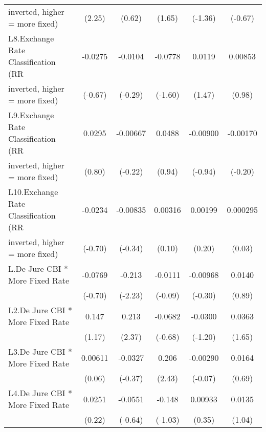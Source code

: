 \begin{table}[htbp]
\begin{tabular}{l*{5}{c}}
inverted, higher = more fixed)          &   (2.25)         &   (0.62)         &   (1.65)         &  (-1.36)         &  (-0.67)         \\
\addlinespace
L8.Exchange Rate Classification (RR     &  -0.0275         &  -0.0104         &  -0.0778         &   0.0119         &  0.00853         \\
inverted, higher = more fixed)          &  (-0.67)         &  (-0.29)         &  (-1.60)         &   (1.47)         &   (0.98)         \\
\addlinespace
L9.Exchange Rate Classification (RR     &   0.0295         & -0.00667         &   0.0488         & -0.00900         & -0.00170         \\
inverted, higher = more fixed)          &   (0.80)         &  (-0.22)         &   (0.94)         &  (-0.94)         &  (-0.20)         \\
\addlinespace
L10.Exchange Rate Classification (RR    &  -0.0234         & -0.00835         &  0.00316         &  0.00199         & 0.000295         \\
inverted, higher = more fixed)          &  (-0.70)         &  (-0.34)         &   (0.10)         &   (0.20)         &   (0.03)         \\
\addlinespace
L.De Jure CBI * More Fixed Rate         &  -0.0769         &   -0.213\sym{*}  &  -0.0111         & -0.00968         &   0.0140         \\
                                        &  (-0.70)         &  (-2.23)         &  (-0.09)         &  (-0.30)         &   (0.89)         \\
\addlinespace
L2.De Jure CBI * More Fixed Rate        &    0.147         &    0.213\sym{*}  &  -0.0682         &  -0.0300         &   0.0363         \\
                                        &   (1.17)         &   (2.37)         &  (-0.68)         &  (-1.20)         &   (1.65)         \\
\addlinespace
L3.De Jure CBI * More Fixed Rate        &  0.00611         &  -0.0327         &    0.206\sym{*}  & -0.00290         &   0.0164         \\
                                        &   (0.06)         &  (-0.37)         &   (2.43)         &  (-0.07)         &   (0.69)         \\
\addlinespace
L4.De Jure CBI * More Fixed Rate        &   0.0251         &  -0.0551         &   -0.148         &  0.00933         &   0.0135         \\
                                        &   (0.22)         &  (-0.64)         &  (-1.03)         &   (0.35)         &   (1.04)         \\

\end{tabular}
\end{table}
